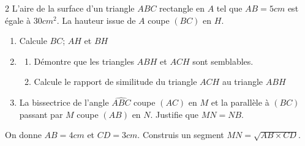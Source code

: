 \begin{multicols*}{2}
  	L'aire de la surface d'un triangle $ABC$ rectangle en $A$ tel que $AB=5cm$ est égale à $30 cm^2$. La hauteur issue de $A$ coupe $(BC)$ en $H$. 
  	
  	\begin{enumerate}
  		\item  Calcule $BC$; $AH$ et $BH$
  		\item  
  		\begin{enumerate}
  			\item  Démontre que les triangles $ABH$ et $ACH$ sont semblables.
  			\item  Calcule le rapport de similitude du triangle $ACH$  au triangle $ABH$
  		\end{enumerate}
  		\item  La bissectrice de l'angle $\widehat{ABC}$ coupe $(AC)$ en $M$ et la parallèle à $(BC)$ passant par $M$ coupe $(AB)$ en $N$. Justifie que $MN=NB$.
  	\end{enumerate}
  	
  	\begin{center}
  	\end{center}
  	On donne $AB=4cm$ et $CD=3cm$. Construis un segment $MN=\sqrt{AB\times CD}$.
  	 
  \end{multicols*}
  

